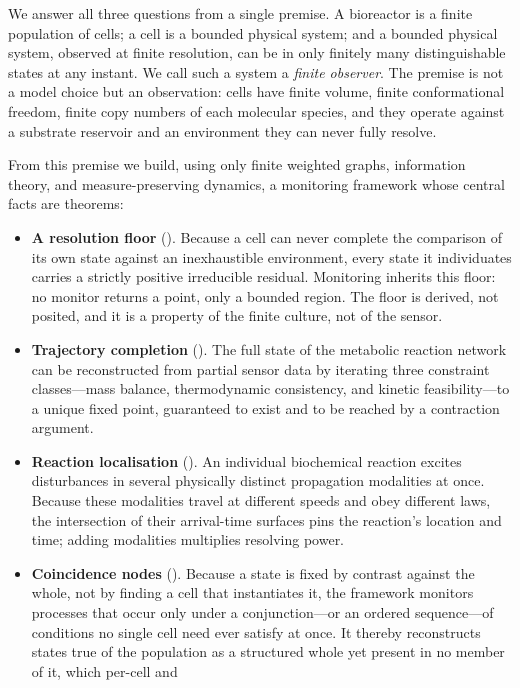 \documentclass[11pt,twocolumn,a4paper]{article}
\theoremstyle{thmstyle}
\theoremstyle{definition}
\theoremstyle{remark}
\begin{document}
We answer all three questions from a single premise. A bioreactor is a
finite population of cells; a cell is a bounded physical system; and a
bounded physical system, observed at finite resolution, can be in only
finitely many distinguishable states at any instant. We call such a system
a \emph{finite observer}. The premise is not a model choice but an
observation: cells have finite volume, finite conformational freedom,
finite copy numbers of each molecular species, and they operate against a
substrate reservoir and an environment they can never fully resolve.

From this premise we build, using only finite weighted graphs, information
theory, and measure-preserving dynamics, a monitoring framework whose
central facts are theorems:

\begin{itemize}[leftmargin=1.6em,itemsep=3pt]
\item \textbf{A resolution floor} (). Because a cell can
never complete the comparison of its own state against an inexhaustible
environment, every state it individuates carries a strictly positive
irreducible residual. Monitoring inherits this floor: no monitor returns a
point, only a bounded region. The floor is derived, not posited, and it is
a property of the finite culture, not of the sensor.
\item \textbf{Trajectory completion} (). The full
state of the metabolic reaction network can be reconstructed from partial
sensor data by iterating three constraint classes---mass balance,
thermodynamic consistency, and kinetic feasibility---to a unique fixed
point, guaranteed to exist and to be reached by a contraction argument.
\item \textbf{Reaction localisation} (). An
individual biochemical reaction excites disturbances in several physically
distinct propagation modalities at once. Because these modalities travel at
different speeds and obey different laws, the intersection of their
arrival-time surfaces pins the reaction's location and time; adding
modalities multiplies resolving power.
\item \textbf{Coincidence nodes} (). Because a state
is fixed by contrast against the whole, not by finding a cell that
instantiates it, the framework monitors processes that occur only under a
conjunction---or an ordered sequence---of conditions no single cell need
ever satisfy at once. It thereby reconstructs states true of the population
as a structured whole yet present in no member of it, which per-cell and

\end{itemize}
\end{document}
